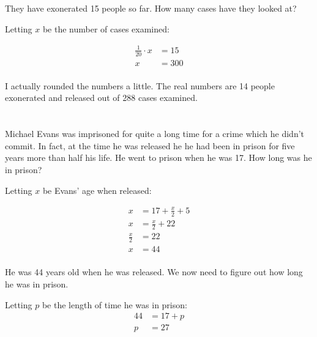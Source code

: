 \documentclass[letterpaper]{exam}
\begin{document}
\begin{questions}
      \begin{parts}

        \part{} They have exonerated 15 people so far.  How many cases have
        they looked at?
          \begin{solution}
            Letting $x$ be the number of cases examined:

            \begin{align*}
              \frac{1}{20} \cdot x & = 15 \\
              x                    & = 300 \\
            \end{align*}

            I actually rounded the numbers a little.  The real numbers are 14
            people exonerated and released out of 288 cases examined.

          \end{solution}

        \part{}
          Michael Evans was imprisoned for quite a long time for a crime which
          he didn't commit.  In fact, at the time he was released he he had
          been in prison for five years more than half his life. He went to
          prison when he was 17.  How long was he in prison? 

          \begin{solution}
            Letting $x$ be Evans' age when released:

            \begin{align*}
              x           & = 17 + \frac{x}{2} + 5 \\
              x           & = \frac{x}{2} + 22 \\
              \frac{x}{2} & = 22 \\
              x           & = 44 \\
            \end{align*}

            He was 44 years old when he was released.  We now need to figure
            out how long he was in prison. 

            Letting $p$ be the length of time he was in prison:
            \begin{align*}
              44 & = 17 + p \\
              p  & = 27 \\
            \end{align*}


\end{solution}
\end{parts}
\end{questions}
\end{document}
